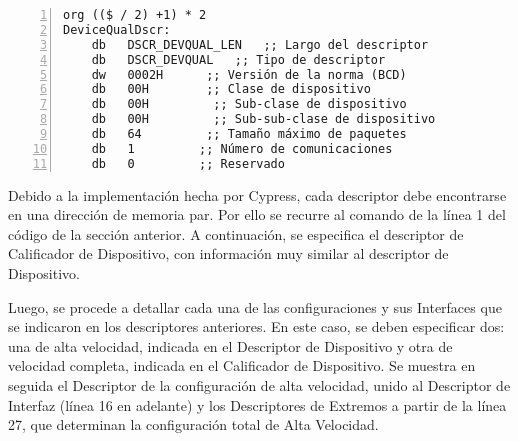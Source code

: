 	\begin{lstlisting}[language={[x86masm]Assembler},backgroundcolor=\color{gray!30},numbers=left]
org (($ / 2) +1) * 2
DeviceQualDscr:
	db   DSCR_DEVQUAL_LEN   ;; Largo del descriptor
	db   DSCR_DEVQUAL   ;; Tipo de descriptor
	dw   0002H      ;; Versión de la norma (BCD)
	db   00H        ;; Clase de dispositivo
	db   00H         ;; Sub-clase de dispositivo
	db   00H         ;; Sub-sub-clase de dispositivo
	db   64         ;; Tamaño máximo de paquetes
	db   1         ;; Número de comunicaciones
	db   0         ;; Reservado
	\end{lstlisting}
	
	Debido a la implementación hecha por Cypress, cada descriptor debe encontrarse en una dirección de memoria par. Por ello se recurre al comando de la línea 1 del código de la sección anterior. A continuación, se especifica el descriptor de Calificador de Dispositivo, con información muy similar al descriptor de Dispositivo.
	
	Luego, se procede a detallar cada una de las configuraciones y sus Interfaces que se indicaron en los descriptores anteriores. En este caso, se deben especificar dos: una de alta velocidad, indicada en el Descriptor de Dispositivo y otra de velocidad completa, indicada en el Calificador de Dispositivo. Se muestra en seguida el Descriptor de la configuración de alta velocidad, unido al Descriptor de Interfaz (línea 16 en adelante) y los Descriptores de Extremos a partir de la línea 27, que determinan la configuración total de Alta Velocidad.
	
